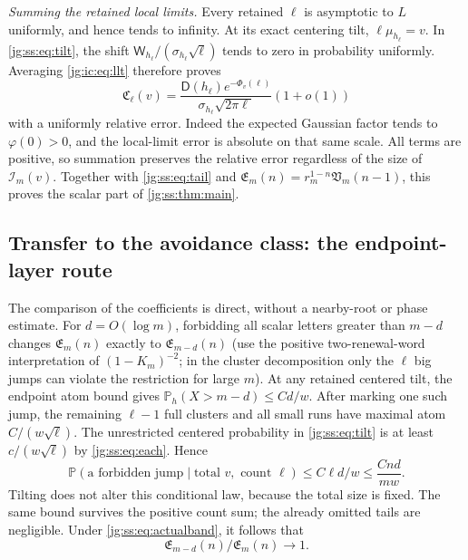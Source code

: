 \documentclass[11pt,a4paper]{article}
\theoremstyle{definition}\newaliascnt{definition}{theorem}
\theoremstyle{remark}\newaliascnt{remark}{theorem}
\newcommand{\ljP}{\mathbb P}
\begin{document}
\emph{Summing the retained local limits.} Every retained $\ell$ is asymptotic to
$L$ uniformly, and hence tends to infinity. At its exact centering tilt,
$\ell\mu_{h_\ell}=v$. In \eqref{jg:ss:eq:tilt}, the shift
$\mathsf W_{h_\ell}/(\sigma_{h_\ell}\sqrt\ell)$ tends to zero in probability
uniformly. Averaging \eqref{jg:ic:eq:llt} therefore proves
\begin{equation}\label{jg:ss:eq:each}
 \mathfrak C_\ell(v)=
 \frac{\mathsf D(h_\ell)e^{-\Phi_v(\ell)}}{\sigma_{h_\ell}\sqrt{2\pi\ell}}
 (1+o(1))
\end{equation}
with a uniformly relative error. Indeed the expected Gaussian factor tends to
$\varphi(0)>0$, and the local-limit error is absolute on that same scale. All
terms are positive, so summation preserves the relative error regardless of the
size of $\mathcal I_m(v)$. Together with \eqref{jg:ss:eq:tail} and
$\mathfrak E_m(n)=r_m^{1-n}\mathfrak V_m(n-1)$, this proves the scalar part of
\cref{jg:ss:thm:main}.

\subsection{Transfer to the avoidance class: the endpoint-layer route}
\label{jg:sec:ss-transfer}
The comparison of the coefficients is direct, without a nearby-root or phase
estimate. For $d=O(\log m)$, forbidding all scalar letters greater than $m-d$
changes $\mathfrak E_m(n)$ exactly to $\mathfrak E_{m-d}(n)$ (use the positive
two-renewal-word interpretation of $(1-K_m)^{-2}$; in the cluster decomposition
only the $\ell$ big jumps can violate the restriction for large $m$). At any
retained centered tilt, the endpoint atom bound gives
$\ljP_h(X>m-d)\le Cd/w$. After marking one such jump, the remaining $\ell-1$ full
clusters and all small runs have maximal atom $C/(w\sqrt\ell)$. The unrestricted
centered probability in \eqref{jg:ss:eq:tilt} is at least $c/(w\sqrt\ell)$ by
\eqref{jg:ss:eq:each}. Hence
\begin{equation}\label{jg:ss:eq:layer}
 \ljP(\text{a forbidden jump}\mid\text{total }v,\text{ count }\ell)
 \le C\ell d/w\le \frac{Cnd}{mw}.
\end{equation}
Tilting does not alter this conditional law, because the total size is fixed.
The same bound survives the positive count sum; the already omitted tails are
negligible. Under \eqref{jg:ss:eq:actualband}, it follows that
\begin{equation}\label{jg:ss:eq:capremove}
 \mathfrak E_{m-d}(n)/\mathfrak E_m(n)\longrightarrow1.
\end{equation}
\end{document}
